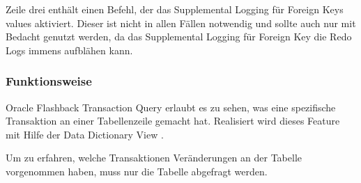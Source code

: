           Zeile drei enthält einen Befehl, der das Supplemental Logging für Foreign Keys values aktiviert. Dieser ist nicht in allen Fällen notwendig und sollte auch nur mit Bedacht genutzt werden, da das Supplemental Logging für Foreign Key die Redo Logs immens aufblähen kann.
        \subsubsection{Funktionsweise}
          Oracle Flashback Transaction Query erlaubt es zu sehen, was eine spezifische Transaktion an einer Tabellenzeile gemacht hat. Realisiert wird dieses Feature mit Hilfe der Data Dictionary View .

          Um zu erfahren, welche Transaktionen Veränderungen an der Tabelle  vorgenommen haben, muss nur die Tabelle  abgefragt werden.

